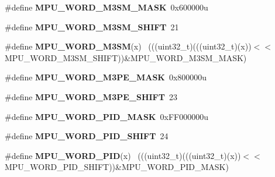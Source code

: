 \begin{DoxyCompactItemize}
\item 
\hypertarget{group___m_p_u___register___masks_ga66fa2f8378ee3158e24b8733413da43d}{}\#define {\bfseries M\+P\+U\+\_\+\+W\+O\+R\+D\+\_\+\+M3\+S\+M\+\_\+\+M\+A\+S\+K}~0x600000u\label{group___m_p_u___register___masks_ga66fa2f8378ee3158e24b8733413da43d}

\item 
\hypertarget{group___m_p_u___register___masks_ga41a8f42d1e7fab735444f5576ccbf61e}{}\#define {\bfseries M\+P\+U\+\_\+\+W\+O\+R\+D\+\_\+\+M3\+S\+M\+\_\+\+S\+H\+I\+F\+T}~21\label{group___m_p_u___register___masks_ga41a8f42d1e7fab735444f5576ccbf61e}

\item 
\hypertarget{group___m_p_u___register___masks_gaff4b0e7afa09ba14fa78b6338d2cd5af}{}\#define {\bfseries M\+P\+U\+\_\+\+W\+O\+R\+D\+\_\+\+M3\+S\+M}(x)                                              ~(((uint32\+\_\+t)(((uint32\+\_\+t)(x))$<$$<$M\+P\+U\+\_\+\+W\+O\+R\+D\+\_\+\+M3\+S\+M\+\_\+\+S\+H\+I\+F\+T))\&M\+P\+U\+\_\+\+W\+O\+R\+D\+\_\+\+M3\+S\+M\+\_\+\+M\+A\+S\+K)\label{group___m_p_u___register___masks_gaff4b0e7afa09ba14fa78b6338d2cd5af}

\item 
\hypertarget{group___m_p_u___register___masks_ga26d07a2d39b4b4873bc68d44585f6cc7}{}\#define {\bfseries M\+P\+U\+\_\+\+W\+O\+R\+D\+\_\+\+M3\+P\+E\+\_\+\+M\+A\+S\+K}~0x800000u\label{group___m_p_u___register___masks_ga26d07a2d39b4b4873bc68d44585f6cc7}

\item 
\hypertarget{group___m_p_u___register___masks_gafccf88108c41e0b025463d1de832fe6a}{}\#define {\bfseries M\+P\+U\+\_\+\+W\+O\+R\+D\+\_\+\+M3\+P\+E\+\_\+\+S\+H\+I\+F\+T}~23\label{group___m_p_u___register___masks_gafccf88108c41e0b025463d1de832fe6a}

\item 
\hypertarget{group___m_p_u___register___masks_gae873b29b111c50ef587d2702b91233aa}{}\#define {\bfseries M\+P\+U\+\_\+\+W\+O\+R\+D\+\_\+\+P\+I\+D\+\_\+\+M\+A\+S\+K}~0x\+F\+F000000u\label{group___m_p_u___register___masks_gae873b29b111c50ef587d2702b91233aa}

\item 
\hypertarget{group___m_p_u___register___masks_ga939df7cf3062667856c6f7f0324fcc2e}{}\#define {\bfseries M\+P\+U\+\_\+\+W\+O\+R\+D\+\_\+\+P\+I\+D\+\_\+\+S\+H\+I\+F\+T}~24\label{group___m_p_u___register___masks_ga939df7cf3062667856c6f7f0324fcc2e}

\item 
\hypertarget{group___m_p_u___register___masks_gabf9369df0ad0fc98c7a191372a049776}{}\#define {\bfseries M\+P\+U\+\_\+\+W\+O\+R\+D\+\_\+\+P\+I\+D}(x)                                                ~(((uint32\+\_\+t)(((uint32\+\_\+t)(x))$<$$<$M\+P\+U\+\_\+\+W\+O\+R\+D\+\_\+\+P\+I\+D\+\_\+\+S\+H\+I\+F\+T))\&M\+P\+U\+\_\+\+W\+O\+R\+D\+\_\+\+P\+I\+D\+\_\+\+M\+A\+S\+K)\label{group___m_p_u___register___masks_gabf9369df0ad0fc98c7a191372a049776}


\end{DoxyCompactItemize}
